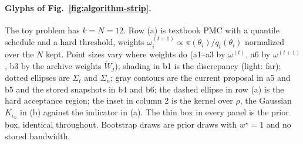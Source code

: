 \documentclass[10pt]{article}
\theoremstyle{plain}
\theoremstyle{definition}
\begin{document}
\paragraph{Glyphs of Fig.~\ref{fig:algorithm-strip}.} The toy problem has $k=N=12$. Row (a) is textbook PMC with a quantile schedule and a hard threshold, weights $\omega^{(t+1)}_i\propto\pi(\theta_i)/q_t(\theta_i)$ normalized over the $N$ kept. Point sizes vary where weights do (a1--a3 by $\omega^{(t)}$, a6 by $\omega^{(t+1)}$, b3 by the archive weights $\tilde W_j$); shading in b1 is the discrepancy (light: far); dotted ellipses are $\Sigma_t$ and $\Sigma_n$; gray contours are the current proposal in a5 and b5 and the stored snapshots in b4 and b6; the dashed ellipse in row (a) is the hard acceptance region; the inset in column 2 is the kernel over $\rho$, the Gaussian $K_{\epsilon_n}$ in (b) against the indicator in (a). The thin box in every panel is the prior box, identical throughout. Bootstrap draws are prior draws with $w^\star=1$ and no stored bandwidth.
\end{document}
